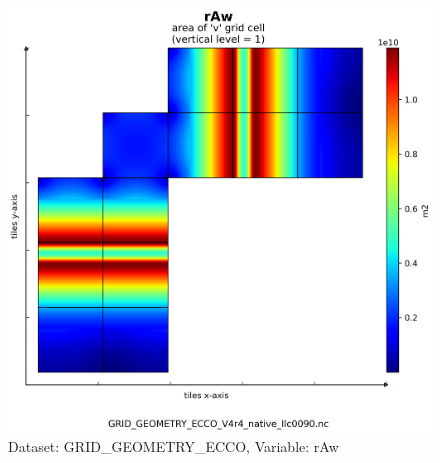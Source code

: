 \begin{figure}[H]
\centering
\includegraphics[scale=0.55]{../images/plots/native_plots_coords/Geometry_Parameters_for_the_Lat-Lon-Cap_90_(llc90)_Native_Model_Grid_(Version_4_Release_4)/rAw.png}
\caption{Dataset: GRID\_GEOMETRY\_ECCO, Variable: rAw}
\label{tab:table-GRID_GEOMETRY_ECCO_rAw-Plot}
\end{figure}
\newpage
\pagebreak
